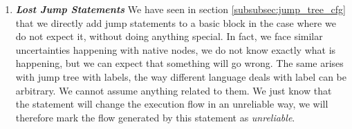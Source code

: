 \begin{enumerate}
	\item \textbf{\textit{Lost Jump Statements}} \newline 
	\label{subsubsec:lost_jump_statement}
	We have seen in section \ref{subsubsec:jump_tree_cfg} that we directly add jump statements to a basic block in the case where we do not expect it, without doing anything special.
	In fact, we face similar uncertainties happening with native nodes, we do not know exactly what is happening, but we can expect that something will go wrong.
	The same arises with jump tree with labels, the way different language deals with label can be arbitrary.
	We cannot assume anything related to them.
	We just know that the statement will change the execution flow in an unreliable way, we will therefore mark the flow generated by this statement as \emph{unreliable}.
\end{enumerate}
